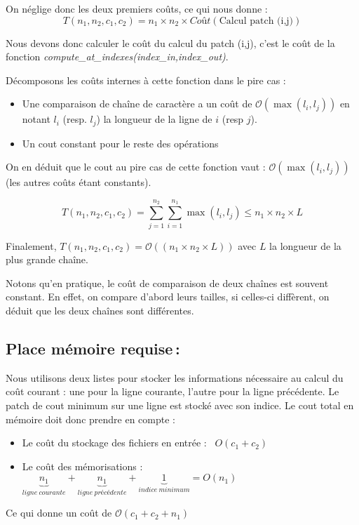 \documentclass[a4paper, 10pt, french]{article}
\newcommand{\cplx}[1]{\mathcal O \left( #1 \right)}
\begin{document}
	On néglige donc les deux premiers coûts, ce qui nous donne :
	\[T(n_1,n_2,c_1,c_2) = n_1 \times n_2 \times Coût(\text{Calcul patch (i,j)})\]

	Nous devons donc calculer le coût du calcul du patch (i,j), c'est le coût de la fonction \emph{compute\_at\_indexes(index\_in,index\_out)}.

	Décomposons les coûts internes à cette fonction dans le pire cas :
	\begin{itemize}
	\item Une comparaison de chaîne de caractère a un coût de $\cplx{\max(l_i,l_j)}$ en notant $l_i$ (resp. $l_j$) la longueur de la ligne de $i$ (resp $j$).
	\item Un cout constant pour le reste des opérations
	\end{itemize}

	On en déduit que le cout au pire cas de cette fonction vaut : $\cplx{\max(l_i,l_j)}$ (les autres coûts étant constants).

	\[T(n_1,n_2,c_1,c_2) = \sum_{j=1}^{n_2} \sum_{i=1}^{n_1} \max(l_i,l_j) \leq n_1 \times n_2 \times L\]

	Finalement, $T(n_1,n_2,c_1,c_2) = \cplx{(n_1 \times n_2 \times L)}$ avec $L$ la longueur de la plus grande chaîne.

    Notons qu'en pratique, le coût de comparaison de deux chaînes est souvent constant. En effet, on compare d'abord leurs tailles, si celles-ci diffèrent, on déduit
    que les deux chaînes sont différentes.

  \subsection{Place mémoire requise\,: }
	Nous utilisons deux listes pour stocker les informations nécessaire au calcul du coût courant : une pour la ligne courante, l'autre pour la ligne
    précédente. Le patch de cout minimum sur une ligne est stocké avec son indice.
    Le cout total en mémoire doit donc prendre en compte :
    \begin{itemize}
    \item Le coût du stockage des fichiers en entrée : \ $O(c_1 + c_2)$
    \item Le coût des mémorisations :  $\underbrace{n_1}_{ligne\ courante} + \underbrace{n_1}_{ligne\ précédente} + \underbrace{1}_{indice \ minimum} = O(n_1)$
    \end{itemize}

    Ce qui donne un coût de $\cplx{c_1 + c_2 + n_1}$
\end{document}
